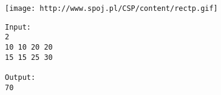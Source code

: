 \texttt{[image: http://www.spoj.pl/CSP/content/rectp.gif]}
\begin{verbatim}
Input:
2
10 10 20 20
15 15 25 30

Output:
70
\end{verbatim}